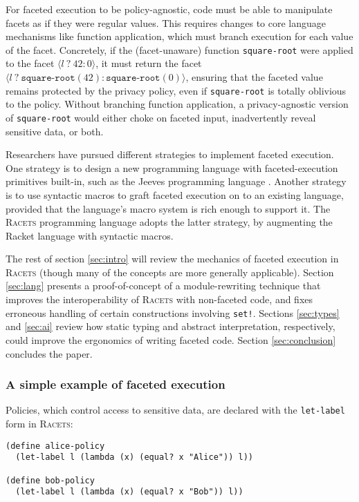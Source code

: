 \documentclass{article}
\begin{document}
For faceted execution to be policy-agnostic, code must be able to manipulate facets as if they were regular values. This requires changes to core language mechanisms like function application, which must branch execution for each value of the facet. Concretely, if the (facet-unaware) function \texttt{square-root} were applied to the facet $\langle l \ ?\ 42 : 0 \rangle$, it must return the facet $\langle l \ ?\ \texttt{square-root}(42) : \texttt{square-root}(0) \rangle$, ensuring that the faceted value remains protected by the privacy policy, even if \texttt{square-root} is totally oblivious to the policy. Without branching function application, a privacy-agnostic version of \texttt{square-root} would either choke on faceted input, inadvertently reveal sensitive data, or both.

Researchers have pursued different strategies to implement faceted execution. One strategy is to design a new programming language with faceted-execution primitives built-in, such as the Jeeves programming language \cite{jeeves}. Another strategy is to use syntactic macros to graft faceted execution on to an existing language, provided that the language's macro system is rich enough to support it. The \textsc{Racets} programming language \cite{racets} adopts the latter strategy, by augmenting the Racket language with syntactic macros.

The rest of section \ref{sec:intro} will review the mechanics of faceted execution in \textsc{Racets} (though many of the concepts are more generally applicable). Section \ref{sec:lang} presents a proof-of-concept of a module-rewriting technique that improves the interoperability of \textsc{Racets} with non-faceted code, and fixes erroneous handling of certain constructions involving \texttt{set!}. Sections \ref{sec:types} and \ref{sec:ai} review how static typing and abstract interpretation, respectively, could improve the ergonomics of writing faceted code. Section \ref{sec:conclusion} concludes the paper.


\subsubsection{A simple example of faceted execution}
Policies, which control access to sensitive data, are declared with the \texttt{let-label} form in \textsc{Racets}:

\begin{lstlisting}
(define alice-policy
  (let-label l (lambda (x) (equal? x "Alice")) l))

(define bob-policy
  (let-label l (lambda (x) (equal? x "Bob")) l))
\end{lstlisting}
\end{document}

